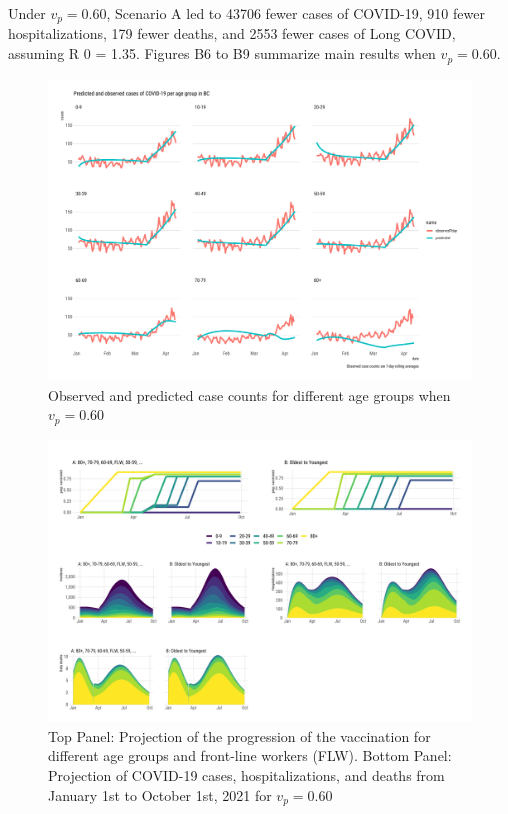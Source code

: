 Under $v_p=0.60$, Scenario A led to 43706 fewer cases of COVID-19, 910 fewer hospitalizations, 179 fewer deaths, and 2553 fewer cases of Long COVID, assuming R 0 = 1.35. Figures B6 to B9 summarize main results when $v_p=0.60$.


\begin{figure}[htb]
\begin{center}
\includegraphics[width=6in]{"../figures/vp0.60/fig-validation.pdf"}
\caption{Observed and predicted case counts for different age groups when $v_p=0.60$}
\end{center}
\end{figure}

\begin{figure}[htb]
\begin{center}
\includegraphics[width=6in]{"../figures/vp0.60/fig-trajectoriesFull.pdf"}
\caption{Top Panel: Projection of the progression of the vaccination for different age groups and front-line workers (FLW). Bottom Panel: Projection of COVID-19 cases, hospitalizations, and deaths from January 1st to October 1st, 2021 for $v_p=0.60$}
\end{center}
\end{figure}


